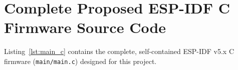 \documentclass[12pt,a4paper]{article}
\begin{document}
\newpage



\newpage
\appendix
\section{Complete Proposed ESP-IDF C Firmware Source Code}
\label{app:source_code}

Listing~\ref{lst:main_c} contains the complete, self-contained ESP-IDF v5.x C firmware (\texttt{main/main.c}) designed for this project.


\end{document}
